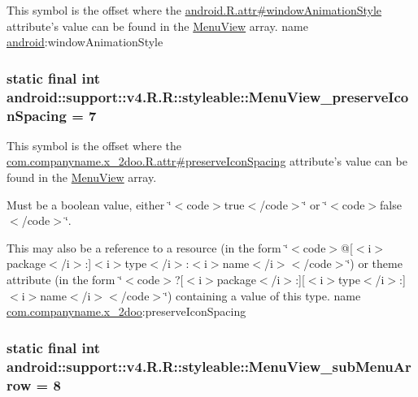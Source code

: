 This symbol is the offset where the \hyperlink{}{android.R.attr\#windowAnimationStyle} attribute's value can be found in the \hyperlink{classandroid_1_1support_1_1v4_1_1_r_1_1styleable_f27b70b4d764f1a1f59531c58e843a3b}{MenuView} array.  name \hyperlink{namespaceandroid}{android}:windowAnimationStyle \hypertarget{classandroid_1_1support_1_1v4_1_1_r_1_1styleable_1a86f6ebd0fdcf4d5eadc06edfcd42c6}{
\subsubsection[{MenuView\_\-preserveIconSpacing}]{\setlength{\rightskip}{0pt plus 5cm}static final int android::support::v4.R.R::styleable::MenuView\_\-preserveIconSpacing = 7}}
\label{classandroid_1_1support_1_1v4_1_1_r_1_1styleable_1a86f6ebd0fdcf4d5eadc06edfcd42c6}


This symbol is the offset where the \hyperlink{classcom_1_1companyname_1_1x__2doo_1_1_r_1_1attr_5a394496882952d599d8a18288b55190}{com.companyname.x\_\-2doo.R.attr\#preserveIconSpacing} attribute's value can be found in the \hyperlink{classandroid_1_1support_1_1v4_1_1_r_1_1styleable_f27b70b4d764f1a1f59531c58e843a3b}{MenuView} array.

Must be a boolean value, either \char`\"{}$<$code$>$true$<$/code$>$\char`\"{} or \char`\"{}$<$code$>$false$<$/code$>$\char`\"{}. 

This may also be a reference to a resource (in the form \char`\"{}$<$code$>$@\mbox{[}$<$i$>$package$<$/i$>$:\mbox{]}$<$i$>$type$<$/i$>$:$<$i$>$name$<$/i$>$$<$/code$>$\char`\"{}) or theme attribute (in the form \char`\"{}$<$code$>$?\mbox{[}$<$i$>$package$<$/i$>$:\mbox{]}\mbox{[}$<$i$>$type$<$/i$>$:\mbox{]}$<$i$>$name$<$/i$>$$<$/code$>$\char`\"{}) containing a value of this type.  name \hyperlink{namespacecom_1_1companyname_1_1x__2doo}{com.companyname.x\_\-2doo}:preserveIconSpacing \hypertarget{classandroid_1_1support_1_1v4_1_1_r_1_1styleable_4e42622f8c86c7431121ce63d8486454}{
\subsubsection[{MenuView\_\-subMenuArrow}]{\setlength{\rightskip}{0pt plus 5cm}static final int android::support::v4.R.R::styleable::MenuView\_\-subMenuArrow = 8}}
\label{classandroid_1_1support_1_1v4_1_1_r_1_1styleable_4e42622f8c86c7431121ce63d8486454}


